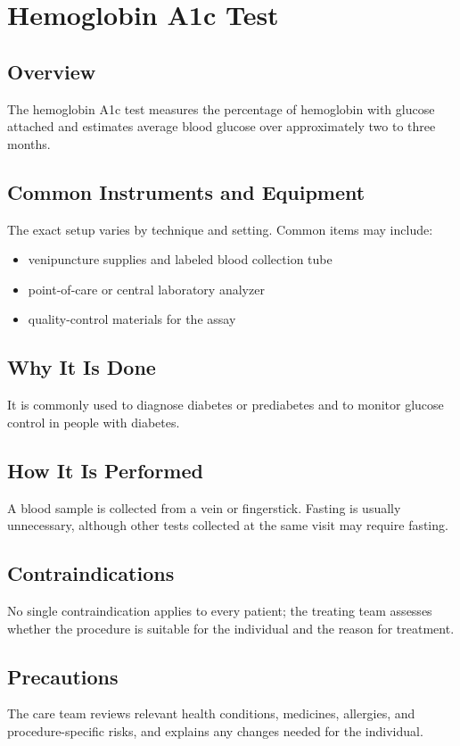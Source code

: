 \chapter{Hemoglobin A1c Test}

\section*{Overview}
The hemoglobin A1c test measures the percentage of hemoglobin with glucose attached and estimates average blood glucose over approximately two to three months.

\section*{Common Instruments and Equipment}
The exact setup varies by technique and setting. Common items may include:
\begin{itemize}[nosep,leftmargin=*]
  \item venipuncture supplies and labeled blood collection tube
  \item point-of-care or central laboratory analyzer
  \item quality-control materials for the assay
\end{itemize}

\section*{Why It Is Done}
It is commonly used to diagnose diabetes or prediabetes and to monitor glucose control in people with diabetes.

\section*{How It Is Performed}
A blood sample is collected from a vein or fingerstick. Fasting is usually unnecessary, although other tests collected at the same visit may require fasting.

\section*{Contraindications}
No single contraindication applies to every patient; the treating team assesses whether the procedure is suitable for the individual and the reason for treatment.

\section*{Precautions}
The care team reviews relevant health conditions, medicines, allergies, and procedure-specific risks, and explains any changes needed for the individual.

